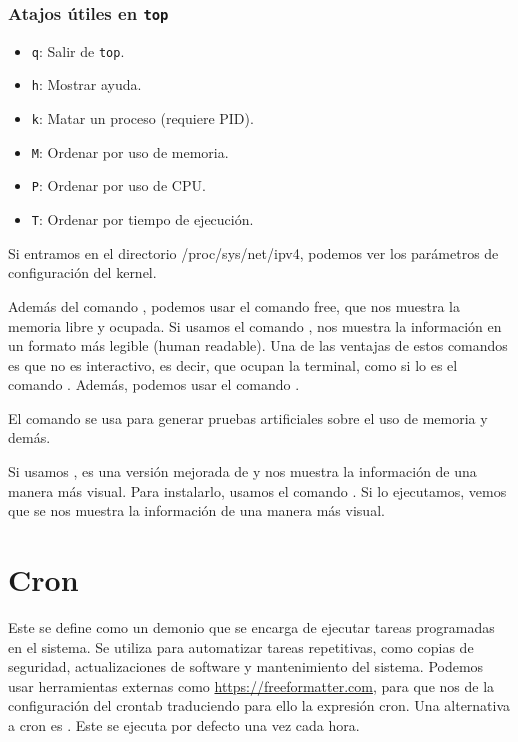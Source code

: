\subsubsection*{Atajos útiles en \texttt{top}}

\begin{itemize}
  \item \texttt{q}: Salir de \texttt{top}.
  \item \texttt{h}: Mostrar ayuda.
  \item \texttt{k}: Matar un proceso (requiere PID).
  \item \texttt{M}: Ordenar por uso de memoria.
  \item \texttt{P}: Ordenar por uso de CPU.
  \item \texttt{T}: Ordenar por tiempo de ejecución.
\end{itemize}


Si entramos en el directorio /proc/sys/net/ipv4, podemos ver los parámetros de configuración del kernel.

Además del comando , podemos usar el comando free, que nos muestra la memoria libre y ocupada. Si usamos el comando , nos muestra la información en un formato más legible (human readable). Una de las ventajas de estos comandos es que no es interactivo, es decir, que ocupan la terminal, como si lo es el comando . Además, podemos usar el comando .

El comando  se usa para generar pruebas artificiales sobre el uso de memoria y demás.

Si usamos , es una versión mejorada de  y nos muestra la información de una manera más visual. Para instalarlo, usamos el comando . Si lo ejecutamos, vemos que se nos muestra la información de una manera más visual.

\section{Cron}

Este se define como un demonio que se encarga de ejecutar tareas programadas en el sistema. Se utiliza para automatizar tareas repetitivas, como copias de seguridad, actualizaciones de software y mantenimiento del sistema. Podemos usar herramientas externas como \url{https://freeformatter.com}, para que nos de la configuración del crontab traduciendo para ello la expresión cron. Una alternativa a cron es . Este se ejecuta por defecto una vez cada hora.

